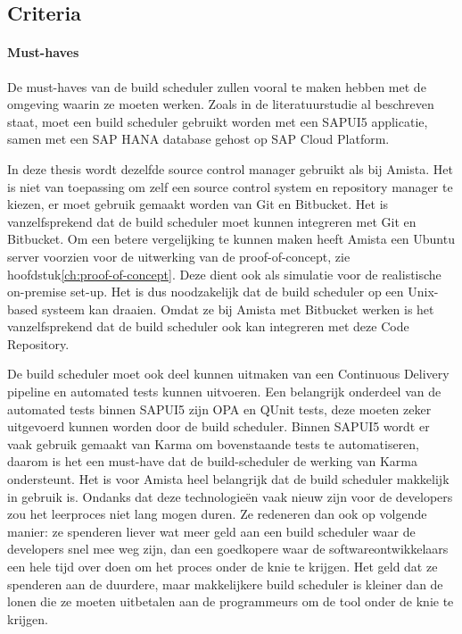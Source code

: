         \subsection{Criteria}
        \label{subsec:criteria}

            \paragraph{Must-haves}
            De must-haves van de build scheduler zullen vooral te maken hebben met de omgeving waarin ze moeten werken. Zoals in de literatuurstudie al beschreven staat, moet een build scheduler gebruikt worden met een SAPUI5 applicatie, samen met een SAP HANA database gehost op SAP Cloud Platform.
            
            In deze thesis wordt dezelfde source control manager gebruikt als bij Amista. Het is niet van toepassing om zelf een source control system en repository manager te kiezen, er moet gebruik gemaakt worden van Git en Bitbucket. Het is vanzelfsprekend dat de build scheduler moet kunnen integreren met Git en Bitbucket.
            Om een betere vergelijking te kunnen maken heeft Amista een Ubuntu server voorzien voor de uitwerking van de proof-of-concept, zie hoofdstuk\ref{ch:proof-of-concept}. Deze dient ook als simulatie voor de realistische on-premise set-up. Het is dus noodzakelijk dat de build scheduler op een Unix-based systeem kan draaien.
            Omdat ze bij Amista met Bitbucket werken is het vanzelfsprekend dat de build scheduler ook kan integreren met deze Code Repository.
            
            De build scheduler moet ook deel kunnen uitmaken van een Continuous Delivery pipeline en automated tests kunnen uitvoeren. Een belangrijk onderdeel van de automated tests binnen SAPUI5 zijn OPA en QUnit  tests, deze moeten zeker uitgevoerd kunnen worden door de build scheduler.
            Binnen SAPUI5 wordt er vaak gebruik gemaakt van Karma om bovenstaande tests te automatiseren, daarom is het een must-have dat de build-scheduler de werking van Karma ondersteunt.
            Het is voor Amista heel belangrijk dat de build scheduler makkelijk in gebruik is. Ondanks dat deze technologieën vaak nieuw zijn voor de developers zou het leerproces niet lang mogen duren. Ze redeneren dan ook op volgende manier: ze spenderen liever wat meer geld aan een build scheduler waar de developers snel mee weg zijn, dan een goedkopere waar de softwareontwikkelaars een hele tijd over doen om het proces onder de knie te krijgen. Het geld dat ze spenderen aan de duurdere, maar makkelijkere build scheduler is kleiner dan de lonen die ze moeten uitbetalen aan de programmeurs om de tool onder de knie te krijgen.
            
